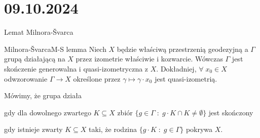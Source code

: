 \section{09.10.2024}{Lemat Milnora-\v{S}varca}

\begin{lemma}{Milnora-\v{S}varca}{M-S lemma}
  Niech $X$ będzie właściwą przestrzenią geodezyjną a $\Gamma$ grupą działającą na $X$ przez izometrie właściwie i kozwarcie. Wówczas $\Gamma$ jest skończenie generowalna i quasi-izometryczna z $X$. Dokładniej, $\forall\;x_0\in X$ odwzorowanie $\Gamma\to X$ określone przez $\gamma\mapsto \gamma\cdot x_0$ jest quasi-izometrią.
\end{lemma}

Mówimy, że grupa działa
\begin{description}[format=\color{orange}]
  \item[właściwie,] gdy dla dowolnego zwartego $K\subseteq X$ zbiór $\{g\in\Gamma\;:\;g\cdot K\cap K\neq \emptyset\}$ jest skończony
  \item[kozwarcie,] gdy istnieje zwarty $K\subseteq X$ taki, że rodzina $\{g\cdot K\;:\;g\in\Gamma\}$ pokrywa $X$.
\end{description}


